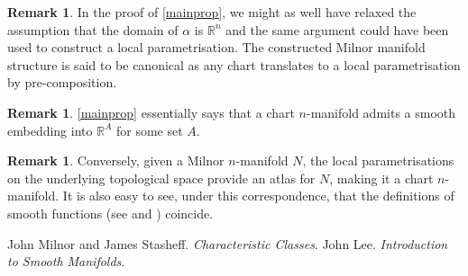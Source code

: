 \documentclass[10pt]{amsart}
\theoremstyle{definition}
\newtheorem{rem}[thm]{Remark}
\begin{document}
\begin{rem}
	In the proof of \cref{mainprop}, we might as well have relaxed the assumption that the domain of $\alpha $ is $\mathbb{R} ^{n}$ and the same argument could have been used to construct a local parametrisation. The constructed Milnor manifold structure is said to be canonical as any chart translates to a local parametrisation by pre-composition.  
\end{rem}
\begin{rem}
	\cref{mainprop} essentially says that a chart $n$-manifold admits a smooth embedding into $\mathbb{R} ^{A}$ for some set $A$.     
\end{rem}

\begin{rem}
	Conversely, given a Milnor $n$-manifold $N$, the local parametrisations on the underlying topological space provide an atlas for $N$, making it a chart $n$-manifold. It is also easy to see, under this correspondence, that the definitions of smooth functions (see \cite[P.17]{Mil} and \cite[P.34]{Lee}) coincide.
\end{rem}


\begin{thebibliography}{Neil1234}
	 John Milnor and James Stasheff. \emph{Characteristic Classes}.
	 John Lee. \emph{Introduction to Smooth Manifolds}.
\end{thebibliography}
\end{document}
